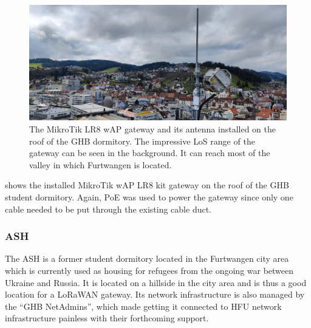 \begin{figure}[htbp]
    \centering
    \includegraphics[width=1\textwidth]{pictures/hardware/gateway-deployment/lr8_ghb_installation.jpg}
    \caption{
        The MikroTik LR8 wAP gateway and its antenna installed on the roof of the \ac{GHB} dormitory.
        The impressive \ac{LoS} range of the gateway can be seen in the background.
        It can reach most of the valley in which Furtwangen is located.
    }\label{pic:mikrotik-gateway-ghb-installation}
\end{figure}

 shows the installed MikroTik wAP LR8 kit gateway on the roof of the \ac{GHB} student dormitory.
Again, \ac{PoE} was used to power the gateway since only one cable needed to be put through the existing cable duct.

\subsubsection{\acf{ASH}}

The \ac{ASH} is a former student dormitory located in the Furtwangen city area which is currently used as housing for refugees from the ongoing war between Ukraine and Russia.
It is located on a hillside in the city area and is thus a good location for a \ac{LoRaWAN} gateway.
Its network infrastructure is also managed by the ``\ac{GHB} NetAdmins'', which made getting it connected to \ac{HFU} network infrastructure painless with their forthcoming support.

